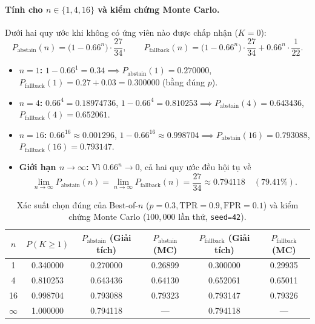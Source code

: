 \paragraph{Tính cho $n \in \{1, 4, 16\}$ và kiểm chứng Monte Carlo.}
Dưới hai quy ước khi không có ứng viên nào được chấp nhận ($K = 0$):
\[
  P_{\text{abstain}}(n) = \bigl(1 - 0.66^n\bigr) \cdot \frac{27}{34}, \qquad
  P_{\text{fallback}}(n) = \bigl(1 - 0.66^n\bigr) \cdot \frac{27}{34} + 0.66^n \cdot \frac{1}{22}.
\]
\begin{itemize}
  \item \textbf{$n = 1$:} $1 - 0.66^1 = 0.34 \implies P_{\text{abstain}}(1) = 0.270000$, $P_{\text{fallback}}(1) = 0.27 + 0.03 = 0.300000$ (bằng đúng $p$).
  \item \textbf{$n = 4$:} $0.66^4 = 0.18974736$, $1 - 0.66^4 = 0.810253 \implies P_{\text{abstain}}(4) = 0.643436$, $P_{\text{fallback}}(4) = 0.652061$.
  \item \textbf{$n = 16$:} $0.66^{16} \approx 0.001296$, $1 - 0.66^{16} \approx 0.998704 \implies P_{\text{abstain}}(16) = 0.793088$, $P_{\text{fallback}}(16) = 0.793147$.
  \item \textbf{Giới hạn $n \to \infty$:} Vì $0.66^n \to 0$, cả hai quy ước đều hội tụ về
  \[
    \lim_{n \to \infty} P_{\text{abstain}}(n) = \lim_{n \to \infty} P_{\text{fallback}}(n) = \frac{27}{34} \approx 0.794118 \quad (79.41\%).
  \]
\end{itemize}

\begin{table}[htbp]
  \centering
  \caption{Xác suất chọn đúng của Best-of-$n$ ($p=0.3, \text{TPR}=0.9, \text{FPR}=0.1$) và kiểm chứng Monte Carlo ($100{,}000$ lần thử, \texttt{seed=42}).}
  \label{tab:c2-results}
  \begin{tabular}{cccccc}
    \toprule
    $n$ & $P(K \ge 1)$ & $P_{\text{abstain}}$ (Giải tích) & $P_{\text{abstain}}$ (MC) & $P_{\text{fallback}}$ (Giải tích) & $P_{\text{fallback}}$ (MC) \\
    \midrule
    1  & 0.340000 & 0.270000 & 0.26899 & 0.300000 & 0.29935 \\
    4  & 0.810253 & 0.643436 & 0.64130 & 0.652061 & 0.65011 \\
    16 & 0.998704 & 0.793088 & 0.79323 & 0.793147 & 0.79326 \\
    $\infty$ & 1.000000 & 0.794118 & --- & 0.794118 & --- \\
    \bottomrule
  \end{tabular}
\end{table}

